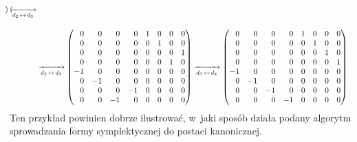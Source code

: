 \documentclass[a4paper,11pt]{article}
\numberwithin{equation}{section}
\begin{document}
\begin{equation}
\begin{split}
\begin{pmatrix}
      \end{pmatrix}
      \xrightarrow[ d_{ 2 } \, \leftrightarrow \, d_{ 3 } ]{ } \\[1em]
    &\xrightarrow[ d_{ 2 } \, \leftrightarrow \, d_{ 3 } ]{ }
      \begin{pmatrix}
        \hphantom{-} 0 & \hphantom{-} 0 & \hphantom{-} 0 & \hphantom{-} 0
        & 1 & 0 & 0 & 0 \\
        \hphantom{-} 0 & \hphantom{-} 0 & \hphantom{-} 0 & \hphantom{-} 0
        & 0 & 1 & 0 & 0 \\
        \hphantom{-} 0 & \hphantom{-} 0 & \hphantom{-} 0 & \hphantom{-} 0
        & 0 & 0 & 0 & 1 \\
        \hphantom{-} 0 & \hphantom{-} 0 & \hphantom{-} 0 & \hphantom{-} 0
        & 0 & 0 & 1 & 0 \\
        -1 & \hphantom{-} 0 & \hphantom{-} 0 & \hphantom{-} 0 & 0 & 0 & 0
                    & 0 \\
        \hphantom{-} 0 & -1 & \hphantom{-} 0 & \hphantom{-} 0 & 0 & 0 & 0
                    & 0 \\
        \hphantom{-} 0 & \hphantom{-} 0 & \hphantom{-} 0 & -1 & 0 & 0 & 0
                    & 0 \\
        \hphantom{-} 0 & \hphantom{-} 0 & -1 & \hphantom{-} 0 & 0 & 0 & 0
                    & 0
      \end{pmatrix}
      \xrightarrow[ d_{ 3 } \, \leftrightarrow \, d_{ 4 } ]{}
      \begin{pmatrix}
        \hphantom{-} 0 & \hphantom{-} 0 & \hphantom{-} 0
        & \hphantom{-} 0 & 1 & 0 & 0 & 0 \\
        \hphantom{-} 0 & \hphantom{-} 0 & \hphantom{-} 0
        & \hphantom{-} 0 & 0 & 1 & 0 & 0 \\
        \hphantom{-} 0 & \hphantom{-} 0 & \hphantom{-} 0
        & \hphantom{-} 0 & 0 & 0 & 1 & 0 \\
        \hphantom{-} 0 & \hphantom{-} 0 & \hphantom{-} 0
        & \hphantom{-} 0 & 0 & 0 & 0 & 1 \\
        -1 & \hphantom{-} 0 & \hphantom{-} 0 & \hphantom{-} 0 & 0
                             & 0 & 0 & 0 \\
        \hphantom{-} 0 & -1 & \hphantom{-} 0 & \hphantom{-} 0 & 0
                             & 0 & 0 & 0 \\
        \hphantom{-} 0 & \hphantom{-} 0 & -1 & \hphantom{-} 0 & 0 & 0
                                 & 0 & 0 \\
        \hphantom{-} 0 & \hphantom{-} 0 & \hphantom{-} 0 & -1 & 0 & 0
        & 0 & 0 \\
      \end{pmatrix}
  \end{split}
\end{equation}
Ten przykład powinien dobrze ilustrować, w~jaki sposób działa podany
algorytm sprowadzania formy symplektycznej do postaci kanonicznej.
\end{document}
